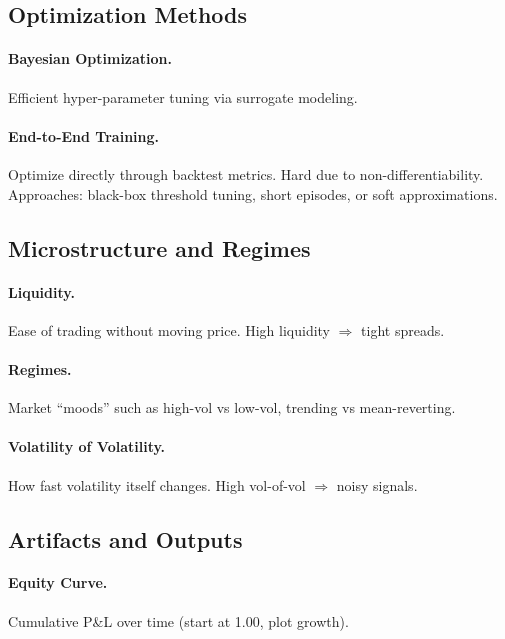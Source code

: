 \documentclass[11pt]{article}
\begin{document}
    \subsection{Optimization Methods}

    \paragraph{Bayesian Optimization.}
    Efficient hyper-parameter tuning via surrogate modeling.

    \paragraph{End-to-End Training.}
    Optimize directly through backtest metrics. Hard due to non-differentiability. Approaches: black-box threshold tuning, short episodes, or soft approximations.

    \subsection{Microstructure and Regimes}

    \paragraph{Liquidity.}
    Ease of trading without moving price. High liquidity $\Rightarrow$ tight spreads.

    \paragraph{Regimes.}
    Market ``moods'' such as high-vol vs low-vol, trending vs mean-reverting.

    \paragraph{Volatility of Volatility.}
    How fast volatility itself changes. High vol-of-vol $\Rightarrow$ noisy signals.

    \subsection{Artifacts and Outputs}

    \paragraph{Equity Curve.}
    Cumulative P\&L over time (start at 1.00, plot growth).
\end{document}
